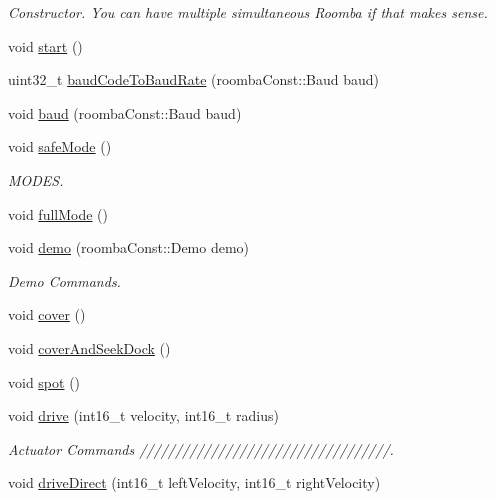 \begin{DoxyCompactItemize}
\begin{DoxyCompactList}\small\item\em Constructor. You can have multiple simultaneous Roomba if that makes sense. \item\end{DoxyCompactList}\item 
void \hyperlink{class_arduino_roomba_a6d5b8f94e27b55bd3a4e63590cf336e0}{start} ()
\item 
uint32\_\-t \hyperlink{class_arduino_roomba_ab69e5496dcb1cb782f85fd61fb0e5e14}{baudCodeToBaudRate} (roombaConst::Baud baud)
\item 
void \hyperlink{class_arduino_roomba_aadbbdc1dd1f0538e48bc21fa8d6467ae}{baud} (roombaConst::Baud baud)
\item 
void \hyperlink{class_arduino_roomba_ac8fb620b0926e6faa570509834434ddf}{safeMode} ()
\begin{DoxyCompactList}\small\item\em MODES. \item\end{DoxyCompactList}\item 
void \hyperlink{class_arduino_roomba_ac4c6eb5bb47c95b7adf712926fa43edb}{fullMode} ()
\item 
void \hyperlink{class_arduino_roomba_a63640d010b0b37647f60040384bea428}{demo} (roombaConst::Demo demo)
\begin{DoxyCompactList}\small\item\em Demo Commands. \item\end{DoxyCompactList}\item 
void \hyperlink{class_arduino_roomba_acb2d35018865cc262ab638436b084362}{cover} ()
\item 
void \hyperlink{class_arduino_roomba_ab64590ea5cdd54a15eb62e96f61839b6}{coverAndSeekDock} ()
\item 
void \hyperlink{class_arduino_roomba_ad4cee03aee250ec956a178e0ca95b297}{spot} ()
\item 
void \hyperlink{class_arduino_roomba_af1d4b64c2e66d1ef8b5583d1d9442856}{drive} (int16\_\-t velocity, int16\_\-t radius)
\begin{DoxyCompactList}\small\item\em Actuator Commands ///////////////////////////////////. \item\end{DoxyCompactList}\item 
void \hyperlink{class_arduino_roomba_a9af2b51a8f3a72a0a906d412c5863fb7}{driveDirect} (int16\_\-t leftVelocity, int16\_\-t rightVelocity)

\end{DoxyCompactItemize}
